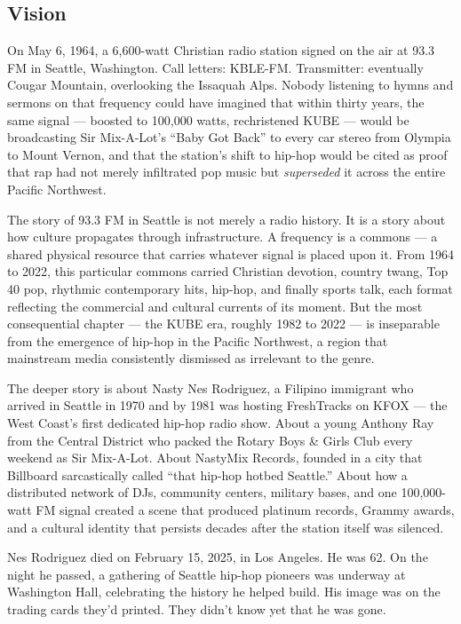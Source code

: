 \documentclass[11pt,letterpaper]{article}
\begin{document}
\subsection{Vision}

On May 6, 1964, a 6,600-watt Christian radio station signed on the air at 93.3 FM in Seattle, Washington. Call letters: KBLE-FM. Transmitter: eventually Cougar Mountain, overlooking the Issaquah Alps. Nobody listening to hymns and sermons on that frequency could have imagined that within thirty years, the same signal --- boosted to 100,000 watts, rechristened KUBE --- would be broadcasting Sir Mix-A-Lot's ``Baby Got Back'' to every car stereo from Olympia to Mount Vernon, and that the station's shift to hip-hop would be cited as proof that rap had not merely infiltrated pop music but \textit{superseded} it across the entire Pacific Northwest.

The story of 93.3 FM in Seattle is not merely a radio history. It is a story about how culture propagates through infrastructure. A frequency is a commons --- a shared physical resource that carries whatever signal is placed upon it. From 1964 to 2022, this particular commons carried Christian devotion, country twang, Top 40 pop, rhythmic contemporary hits, hip-hop, and finally sports talk, each format reflecting the commercial and cultural currents of its moment. But the most consequential chapter --- the KUBE era, roughly 1982 to 2022 --- is inseparable from the emergence of hip-hop in the Pacific Northwest, a region that mainstream media consistently dismissed as irrelevant to the genre.

The deeper story is about Nasty Nes Rodriguez, a Filipino immigrant who arrived in Seattle in 1970 and by 1981 was hosting FreshTracks on KFOX --- the West Coast's first dedicated hip-hop radio show. About a young Anthony Ray from the Central District who packed the Rotary Boys \& Girls Club every weekend as Sir Mix-A-Lot. About NastyMix Records, founded in a city that Billboard sarcastically called ``that hip-hop hotbed Seattle.'' About how a distributed network of DJs, community centers, military bases, and one 100,000-watt FM signal created a scene that produced platinum records, Grammy awards, and a cultural identity that persists decades after the station itself was silenced.

Nes Rodriguez died on February 15, 2025, in Los Angeles. He was 62. On the night he passed, a gathering of Seattle hip-hop pioneers was underway at Washington Hall, celebrating the history he helped build. His image was on the trading cards they'd printed. They didn't know yet that he was gone.
\end{document}

